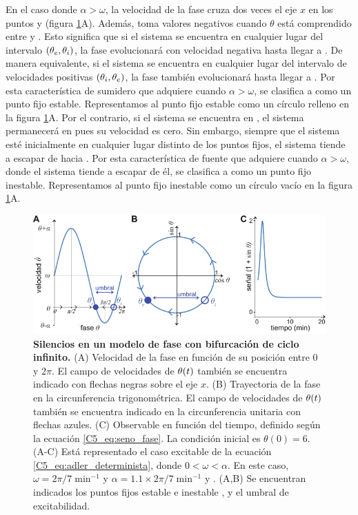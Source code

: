 \documentclass[./main.tex]{subfiles}
\begin{document}
En el caso donde $\alpha > \omega$, la velocidad de la fase cruza dos veces el eje $x$ en los puntos \xxe y \xxi (figura \ref{C5_fig:adler_determinista_excitable}A). Además, toma valores negativos cuando $\theta$ está comprendido entre \xxe y \xxi. Esto significa que si el sistema se encuentra en cualquier lugar del intervalo $(\theta_e,\theta_i)$, la fase evolucionará con velocidad negativa hasta llegar a \xxe. De manera equivalente, si el sistema se encuentra en cualquier lugar del intervalo de velocidades positivas $(\theta_i,\theta_e)$, la fase también evolucionará hasta llegar a \xxe. Por esta característica de sumidero que adquiere \xxe cuando $\alpha > \omega$, se clasifica a \xxe como un punto fijo estable. Representamos al punto fijo estable como un círculo relleno en la figura \ref{C5_fig:adler_determinista_excitable}A. Por el contrario, si el sistema se encuentra en \xxi, el sistema permanecerá en \xxi pues su velocidad es cero. Sin embargo, siempre que el sistema esté inicialmente en cualquier lugar distinto de los puntos fijos, el sistema tiende a escapar de \xxi hacia \xxe.  Por esta característica de fuente que adquiere \xxi cuando $\alpha > \omega$, donde el sistema tiende a escapar de él, se clasifica a \xxi como un punto fijo inestable. Representamos al punto fijo inestable como un círculo vacío en la figura \ref{C5_fig:adler_determinista_excitable}A.


 \begin{figure}
    \centering
    \includegraphics[width=1\columnwidth]{figures/chapter5/C5_determinista_excitable.pdf} 
    \caption{\textbf{Silencios en un modelo de fase con bifurcación de ciclo infinito.} (A) Velocidad de la fase en función de su posición entre $0$ y $2\pi$. El campo de velocidades de $\theta(t)$ también se encuentra indicado con flechas negras sobre el eje $x$. (B) Trayectoria de la fase en la circunferencia trigonométrica. El campo de velocidades de $\theta(t)$ también se encuentra indicado en la circunferencia unitaria con flechas azules. (C) Observable en función del tiempo, definido según la ecuación \ref{C5_eq:seno_fase}. La condición inicial es $\theta(0) = 6$. (A-C) Está representado el caso excitable de la ecuación \ref{C5_eq:adler_determinista}, donde $ 0 < \omega < \alpha$. En este caso, $\omega = 2 \pi/7 \; \text{min}^{-1}$ y $\alpha = 1.1 \times 2 \pi/7 \; \text{min}^{-1}$ y . (A,B) Se encuentran indicados los puntos fijos estable \xxe e inestable \xxi, y el umbral de excitabilidad.}
    \label{C5_fig:adler_determinista_excitable}
\end{figure}
\end{document}
